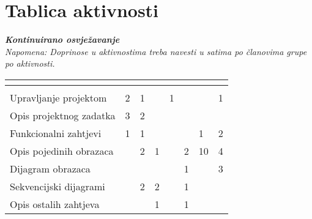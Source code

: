 		\eject
		\section*{Tablica aktivnosti}
		
			\textbf{\textit{Kontinuirano osvježavanje}}\\
			
			 \textit{Napomena: Doprinose u aktivnostima treba navesti u satima po članovima grupe po aktivnosti.}
					
						
			
			\begin{longtabu} to \textwidth {|X[7, l]|X[1, c]|X[1, c]|X[1, c]|X[1, c]|X[1, c]|X[1, c]|X[1, c]|}
								
				  &      &  &	 &	 &
				 &
				 &	 \\ \hline 
				\endfirsthead
				
			
				  &      &  &	 &
 &	 &
 &	 \\ \hline 
				\endhead
				
				
				\endfoot
							
				 
				\endlastfoot
				
				Upravljanje projektom 		& 2 & 1 &  & 1 &  &  & 1 \\ \hline
				Opis projektnog zadatka 	& 3 & 2 &  &  &  &  & \\ \hline
				
				Funkcionalni zahtjevi       & 1 & 1 &  &  &  & 1 & 2 \\ \hline
				Opis pojedinih obrazaca 	&  & 2 & 1 &  & 2 & 10 & 4 \\ \hline
				Dijagram obrazaca 			&  &  &  &  & 1 &  & 3 \\ \hline
				Sekvencijski dijagrami 		&  & 2 & 2 &  & 1 &  &  \\ \hline
				Opis ostalih zahtjeva 		&  &  & 1 &  & 1 &  &  \\ \hline


\end{longtabu}
